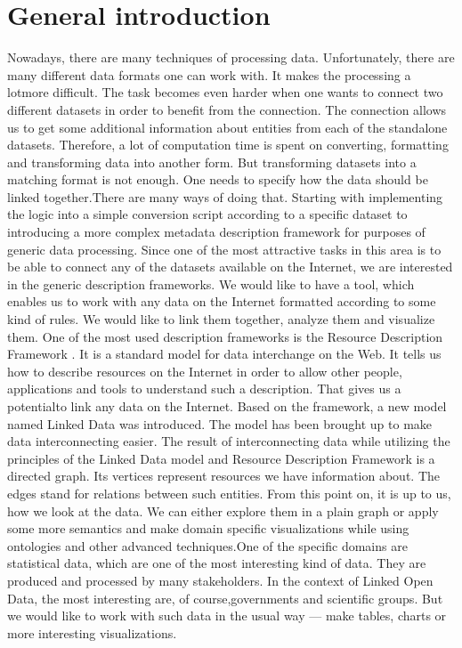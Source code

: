\documentclass[a4paper,12pt,oneside]{report}
\begin{document}
 \chapter*{General introduction}
{Nowadays, there are many techniques of processing data. Unfortunately, there are many different data formats one can work with. It makes the processing a lotmore difficult. The task becomes even harder when one wants to connect two different datasets in order to benefit from the connection. The connection allows us to get some additional information about entities from each of the standalone datasets. Therefore, a lot of computation time is spent on converting, formatting and transforming data into another form. But transforming datasets into
a matching format is not enough. One needs to specify how the data should be linked together.There are many ways of doing that. Starting with implementing the logic into a simple conversion script according to a specific dataset to introducing a more complex metadata description framework for purposes of generic data processing. Since one of the most attractive tasks in this area is to be able to connect any of the datasets available on the Internet, we are interested in the generic description frameworks. We would like to have a tool, which enables us to work with any data on the Internet formatted according to some kind of rules. We would like to link them together, analyze them and visualize them.
One of the most used description frameworks is the Resource Description Framework . It is a standard model for data interchange on the Web. It tells us how to describe resources on the Internet in order to allow other people, applications and tools to understand such a description. That gives us a potentialto link any data on the Internet. Based on the framework, a new model named Linked Data was introduced. The model has been brought up to make data interconnecting easier.
The result of interconnecting data while utilizing the principles of the Linked Data model and Resource Description Framework is a directed graph. Its vertices represent resources we have information about. The edges stand for relations between such entities. From this point on, it is up to us, how we look at the data. We can either explore them in a plain graph or apply some more semantics and make domain specific visualizations while using ontologies and other advanced techniques.One of the specific domains are statistical data, which are one of the most interesting kind of data. They are produced and processed by many stakeholders. In the context of Linked Open Data, the most interesting are, of course,governments and scientific groups. But we would like to work with such data in the usual way — make tables, charts or more interesting visualizations. }
\end{document}
